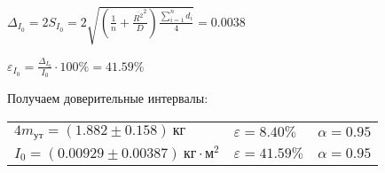 \begin{enumerate}
    $\displaystyle \Delta_{I_0} = 2S_{{I_0}} = 2\sqrt{\left(\frac{1}{n} + \frac{\overline{R^2}^2}{D}\right) \frac{\sum_{i = 1}^n d_i}{4}} = 0.0038$

    $\displaystyle \varepsilon_{I_0} = \frac{\Delta_{I_0}}{I_0} \cdot 100\% = 41.59\%$

    Получаем доверительные интервалы:

    \begin{tabular}{lll}
        $4m_{ут} = (1.882 \pm 0.158) \ \text{кг}$ & $\varepsilon = 8.40\%$ & $\alpha = 0.95$ \\

        $I_0 = (0.00929 \pm 0.00387) \ \text{кг} \cdot \text{м}^2$ & $\varepsilon = 41.59\%$ & $\alpha = 0.95$ \\
    \end{tabular}

    \smallvspace



\end{enumerate}